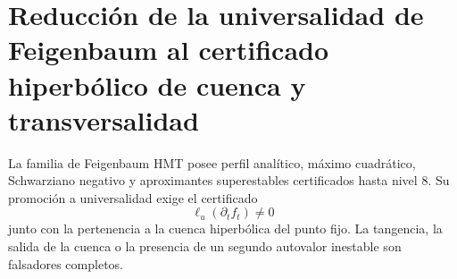 \section{Reducción de la universalidad de Feigenbaum al certificado hiperbólico de cuenca y transversalidad}
\label{sec:p3-final:cierre-feigenbaum}

La familia de Feigenbaum HMT posee perfil analítico, máximo cuadrático,
Schwarziano negativo y aproximantes superestables certificados hasta nivel
\(8\). Su promoción a universalidad exige el certificado
\[
 \ell_u(\partial_t f_t)\ne0
\]
junto con la pertenencia a la cuenca hiperbólica del punto fijo. La tangencia,
la salida de la cuenca o la presencia de un segundo autovalor inestable son
falsadores completos.
